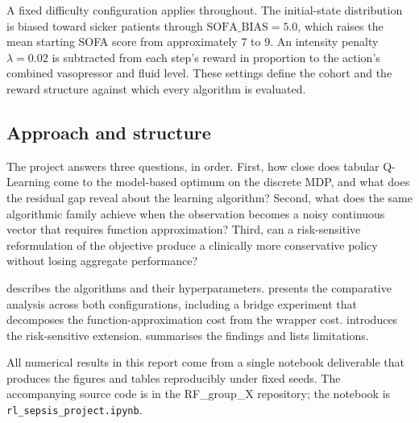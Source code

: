 A fixed difficulty configuration applies throughout. The initial-state distribution is biased toward sicker patients through $\text{SOFA\_BIAS} = 5.0$, which raises the mean starting SOFA score from approximately 7 to 9. An intensity penalty $\lambda = 0.02$ is subtracted from each step's reward in proportion to the action's combined vasopressor and fluid level. These settings define the cohort and the reward structure against which every algorithm is evaluated.

\subsection{Approach and structure}

The project answers three questions, in order. First, how close does tabular Q-Learning come to the model-based optimum on the discrete MDP, and what does the residual gap reveal about the learning algorithm? Second, what does the same algorithmic family achieve when the observation becomes a noisy continuous vector that requires function approximation? Third, can a risk-sensitive reformulation of the objective produce a clinically more conservative policy without losing aggregate performance?

 describes the algorithms and their hyperparameters.  presents the comparative analysis across both configurations, including a bridge experiment that decomposes the function-approximation cost from the wrapper cost.  introduces the risk-sensitive extension.  summarises the findings and lists limitations.

All numerical results in this report come from a single notebook deliverable that produces the figures and tables reproducibly under fixed seeds. The accompanying source code is in the RF\_group\_X repository; the notebook is \texttt{rl\_sepsis\_project.ipynb}.
